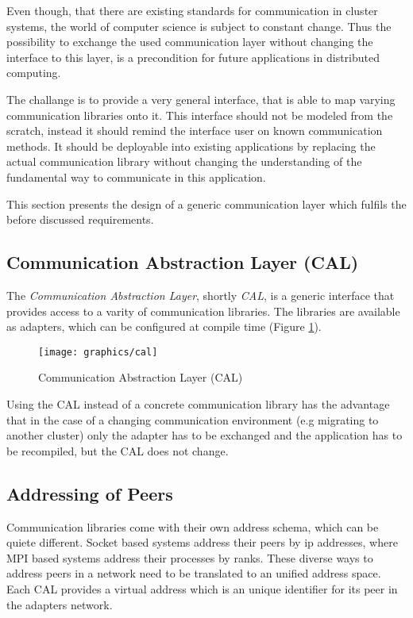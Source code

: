 Even though, that there are existing standards for communication in
cluster systems, the world of computer science is subject to constant
change. Thus the possibility to exchange the used communication layer
without changing the interface to this layer, is a precondition for
future applications in distributed computing.

The challange is to provide a very general interface, that is able to
map varying communication libraries onto it. This interface should not
be modeled from the scratch, instead it should remind the interface
user on known communication methods. It should be deployable into existing
applications by replacing the actual communication library without
changing the understanding of the fundamental way to communicate in
this application.

This section presents the design of a generic communication layer
which fulfils the before discussed requirements.

\subsection{Communication Abstraction Layer (CAL)}
The \textit{Communication Abstraction Layer}, shortly \textit{CAL}, is
a generic interface that provides access to a varity of communication
libraries. The libraries are available as adapters, which can be
configured at compile time (Figure \ref{fig:cal}).

\begin{figure}[H]
  \centering
  \texttt{[image: graphics/cal]}
  \caption{Communication Abstraction Layer (CAL)}
  \label{fig:cal}
\end{figure}

Using the CAL instead of a concrete communication library has the
advantage that in the case of a changing communication environment
(e.g migrating to another cluster) only the adapter has to be
exchanged and the application has to be recompiled, but the CAL does
not change.

\subsection{Addressing of Peers}
Communication libraries come with their own address schema, which can
be quiete different. Socket based systems address their peers by ip
addresses, where MPI based systems address their processes by ranks.
These diverse ways to address peers in a network need to be translated
to an unified address space. Each CAL provides a virtual address
which is an unique identifier for its peer in the adapters network.

